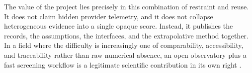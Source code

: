 \documentclass[10pt,a4paper]{article}
\begin{document}
The value of the project lies precisely in this combination of restraint and reuse. It does not claim hidden provider telemetry, and it does not collapse heterogeneous evidence into a single opaque score. Instead, it publishes the records, the assumptions, the interfaces, and the extrapolative method together. In a field where the difficulty is increasingly one of comparability, accessibility, and traceability rather than raw numerical absence, an open observatory plus a fast screening workflow is a legitimate scientific contribution in its own right \cite{impactllmrepo2026}.



\end{document}
